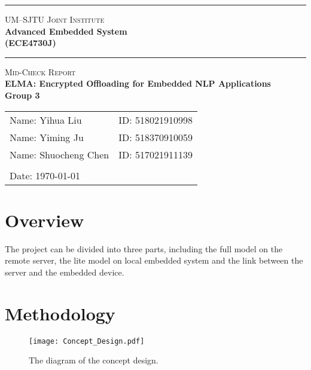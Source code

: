 \documentclass[a4paper]{article}
\begin{document}
\begin{titlepage}
    \vspace*{0.25cm}
    \noindent\rule[0.25\baselineskip]{\textwidth}{1pt}
    \begin{center}
        \huge{\textsc{UM--SJTU Joint Institute}}\vspace{0.3em}\\
        \huge{\textbf{Advanced Embedded System}}\vspace{0.3em}\\
        \Large{\textbf{(ECE4730J)}}
        \noindent\rule[0.25\baselineskip]{\textwidth}{1pt}
    \end{center}
    \begin{center}
        \vspace{5cm}
        \LARGE{\textsc{Mid-Check Report}}\vspace{0.5em}\\
        \Large{\textbf{ELMA: Encrypted Offloading for Embedded NLP Applications}}\vspace{1em}\\
        \Large{\textbf{Group 3}}\\
    \end{center}
    \vfill
    \large
    \begin{tabular}{ll}
        Name: Yihua Liu \hspace*{2em}&ID: 518021910998\hspace*{2em}\\
        Name: Yiming Ju \hspace*{2em}&ID: 518370910059\hspace*{2em}\\
        Name: Shuocheng Chen \hspace*{2em}&ID: 517021911139\hspace*{2em}\\
        \\
        Date: \today
    \end{tabular}
\end{titlepage}
\tableofcontents
\newpage
\section{Overview}

The project can be divided into three parts, including the full model on the remote server, the lite model on local embedded system and the link between the server and the embedded device. 

\section{Methodology}
\begin{figure}[H]
    \centering
    \texttt{[image: Concept\_Design.pdf]}
    \caption{The diagram of the concept design.}
\end{figure}
\end{document}
